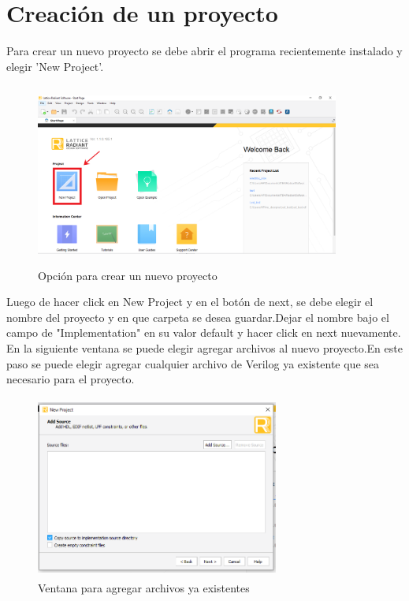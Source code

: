 \documentclass{article}
\begin{document}
\section{Creación de un proyecto}
	Para crear un nuevo proyecto se debe abrir el programa recientemente instalado y elegir 'New Project'.
	\begin{figure}[H]
	\centering
	\includegraphics[height=6cm,width=10cm]{Imagenes/NewProj.png}
	\caption{Opción para crear un nuevo proyecto}
	\end{figure}
	
	Luego de hacer click en New Project y en el botón de next, se debe elegir el nombre del proyecto y en que carpeta se desea guardar.Dejar el nombre bajo el campo de "Implementation" en su valor default y hacer click en next nuevamente.
	En la siguiente ventana se puede elegir agregar archivos al nuevo proyecto.En este paso se puede elegir agregar cualquier archivo de Verilog ya existente que sea necesario para el proyecto.
	\begin{figure}[H]
	\centering
	\includegraphics[height=6cm,width=8cm]{Imagenes/AddSources.png}
	\caption{Ventana para agregar archivos ya existentes}
	\end{figure}
	
\end{document}
